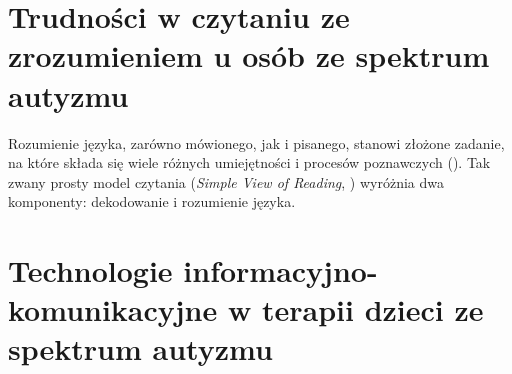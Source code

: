 \section{Trudności w czytaniu ze zrozumieniem u osób ze spektrum autyzmu}

    Rozumienie języka, zarówno mówionego, jak i pisanego, stanowi złożone zadanie, na które składa się wiele różnych umiejętności i procesów poznawczych (\cite{cain2008children}). Tak zwany prosty model czytania (\emph{Simple View of Reading}, \cite{hoover1990simple}) wyróżnia dwa komponenty: dekodowanie i rozumienie języka. 

\section{Technologie informacyjno-komunikacyjne w terapii dzieci ze spektrum autyzmu}